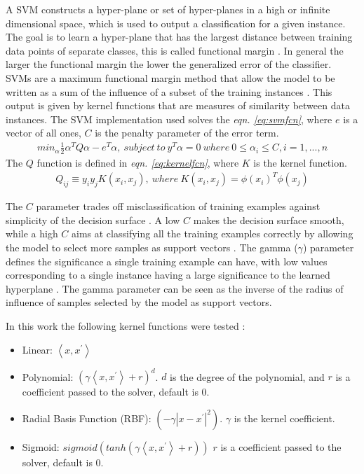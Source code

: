 \documentclass[ms]{nuthesis}
\begin{document}
\FloatBarrier
\par A SVM constructs a hyper-plane or set of hyper-planes in a high or infinite dimensional space, which
is used to output a classification for a given instance. The goal is to learn a hyper-plane that has
the largest distance between training data points of separate classes, this is called functional margin
\cite{scikit-learn}. In general the larger the functional margin the lower the generalized error of the
classifier. SVMs are a maximum functional margin method that allow the model to be written as a sum of the
influence of a subset of the training instances \cite{ethem}. This output is given by kernel functions
that are measures of similarity between data instances. The SVM implementation used solves the
\textit{eqn. \ref{eq:svmfcn}}, where $e$ is a vector of all ones, $C$ is the penalty parameter of the
error term.
\FloatBarrier
\begin{equation}
\label{eq:svmfcn}
\begin{aligned}
min_{\alpha} \frac{1}{2} \alpha^{T} Q\alpha - e^T\alpha, \
subject\  to\ y^T \alpha = 0 \ where\ 0\leq\alpha_i\leq C,i=1,...,n
\end{aligned}
\end{equation}
\FloatBarrier
The $Q$ function is defined in \textit{eqn. \ref{eq:kernelfcn}}, where $K$ is the kernel function.
\FloatBarrier
\begin{equation}
\label{eq:kernelfcn}
\begin{aligned}
Q_{ij}\equiv y_i y_j K(x_i,x_j), \ where \ K(x_i,x_j)=\phi (x_i)^T \phi(x_j)
\end{aligned}
\end{equation}
\FloatBarrier

The $C$ parameter trades off misclassification of training examples against simplicity of the
decision surface \cite{scikit-learn}. A low $C$ makes the decision surface smooth, while a high $C$ aims at
classifying all the training examples correctly by allowing the model to select more samples as support
vectors \cite{scikit-learn}. The gamma ($\gamma$) parameter defines the significance a single training example
 can have, with low values corresponding to a single instance having a large significance to the
 learned hyperplane \cite{scikit-learn}. The gamma parameter can be seen as the inverse of the radius of
 influence of samples selected by the model as support vectors.

In this work the following kernel functions were tested \cite{scikit-learn}:
\begin{itemize}
  \item Linear: $\left \langle x,x^{'} \right \rangle$
  \item Polynomial: $(\gamma \left \langle x,x^{'} \right \rangle + r)^{d}$. $d$ is the degree
  of the polynomial, and $r$ is a coefficient passed to the solver, default is $0$.
  \item Radial Basis Function (RBF): $(-\gamma |x-x^{'}|^{2})$. $\gamma$ is the kernel coefficient.
  \item Sigmoid: $sigmoid(tanh(\gamma \left \langle x,x^{'} \right \rangle + r))$
  $r$ is a coefficient passed to the solver, default is $0$.
\end{itemize}
\end{document}
